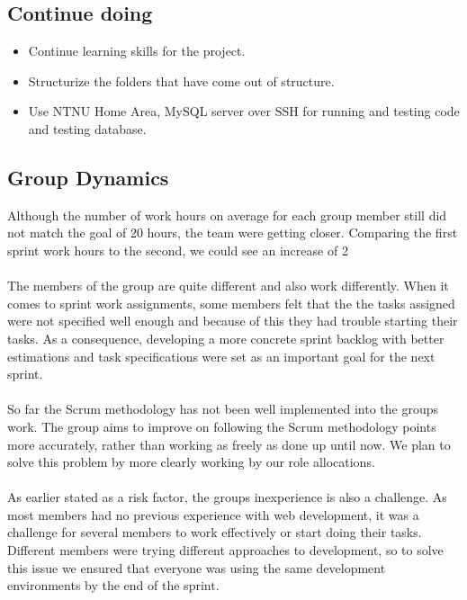 \subsection{Continue doing}
\label{subsec:S2RetrospectiveContinue}
\begin{itemize}
\item Continue learning skills for the project.
\item Structurize the folders that have come out of structure. 
\item Use NTNU Home Area, MySQL server over SSH for running and testing code and testing database.
\end{itemize}

\subsection{Group Dynamics}
\label{subsec:S2RetrospectiveDynamics}

Although the number of work hours on average for each group member still did not match the goal of 20 hours, the team were getting closer. Comparing the first sprint work hours to the second, we could see an increase of 2 %

\paragraph{} The members of the group are quite different and also work differently. When it comes to sprint work assignments, some members felt that the the tasks assigned were not specified well enough and because of this they had trouble starting their tasks. As a consequence, developing a more concrete sprint backlog with better estimations and task specifications were set as an important goal for the next sprint.

\paragraph{} So far the Scrum methodology has not been well implemented into the groups work. The group aims to improve on following the Scrum methodology points more accurately, rather than working as freely as done up until now. We plan to solve this problem by more clearly working by our role allocations.

\paragraph{} As earlier stated as a risk factor, the groups inexperience is also a challenge. As most members had no previous experience with web development, it was a challenge for several members to work effectively or start doing their tasks. Different members were trying different approaches to development, so to solve this issue we ensured that everyone was using the same development environments by the end of the sprint. 

